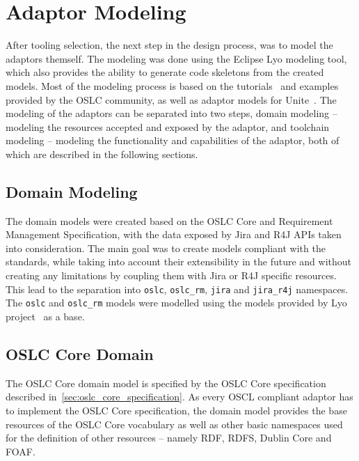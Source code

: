 \section{Adaptor Modeling}
After tooling selection, the next step in the design process, was to model the adaptors themself. The modeling was done using the Eclipse Lyo modeling tool, which also provides the ability to generate code skeletons from the created models. Most of the modeling process is based on the tutorials \cite{oslc_domain_workshop}\cite{oslc_toolchain_workshop}\cite{youtube_lyo_tutorial} and examples \cite{github_oslc_lyo-adaptor-sample-modelling}\cite{github_oslc_bugzilla} provided by the OSLC community, as well as adaptor models for Unite \cite{unite_gitlab}. The modeling of the adaptors can be separated into two steps, domain modeling -- modeling the resources accepted and exposed by the adaptor, and toolchain modeling -- modeling the functionality and capabilities of the adaptor, both of which are described in the following sections.

\subsection{Domain Modeling}
The domain models were created based on the OSLC Core and Requirement Management Specification, with the data exposed by Jira and R4J APIs taken into consideration. The main goal was to create models compliant with the standards, while taking into account their extensibility in the future and without creating any limitations by coupling them with Jira or R4J specific resources. This lead to the separation into \texttt{oslc}, \texttt{oslc\_rm}, \texttt{jira} and \texttt{jira\_r4j} namespaces. The \texttt{oslc} and \texttt{oslc\_rm} models were modelled using the models provided by Lyo project \cite{lyo_domains} as a base.


\subsection*{OSLC Core Domain}
The OSLC Core domain model is specified by the OSLC Core specification described in \ref{sec:oslc_core_specification}. As every OSCL compliant adaptor has to implement the OSLC Core specification, the domain model provides the base resources of the OSLC Core vocabulary as well as other basic namespaces used for the definition of other resources -- namely RDF, RDFS, Dublin Core and FOAF. %

